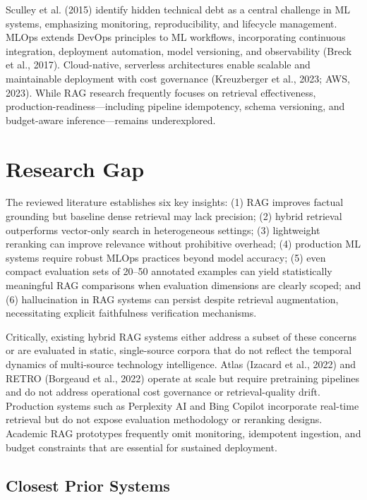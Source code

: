Sculley et al. (2015) identify hidden technical debt as a central challenge in ML systems, emphasizing monitoring, reproducibility, and lifecycle management. MLOps extends DevOps principles to ML workflows, incorporating continuous integration, deployment automation, model versioning, and observability (Breck et al., 2017). Cloud-native, serverless architectures enable scalable and maintainable deployment with cost governance (Kreuzberger et al., 2023; AWS, 2023). While RAG research frequently focuses on retrieval effectiveness, production-readiness---including pipeline idempotency, schema versioning, and budget-aware inference---remains underexplored.

\section{Research Gap}
\label{sec:gap}

The reviewed literature establishes six key insights: (1) RAG improves factual grounding but baseline dense retrieval may lack precision; (2) hybrid retrieval outperforms vector-only search in heterogeneous settings; (3) lightweight reranking can improve relevance without prohibitive overhead; (4) production ML systems require robust MLOps practices beyond model accuracy; (5) even compact evaluation sets of 20--50 annotated examples can yield statistically meaningful RAG comparisons when evaluation dimensions are clearly scoped; and (6) hallucination in RAG systems can persist despite retrieval augmentation, necessitating explicit faithfulness verification mechanisms.

Critically, existing hybrid RAG systems either address a subset of these concerns or are evaluated in static, single-source corpora that do not reflect the temporal dynamics of multi-source technology intelligence. Atlas (Izacard et al., 2022) and RETRO (Borgeaud et al., 2022) operate at scale but require pretraining pipelines and do not address operational cost governance or retrieval-quality drift. Production systems such as Perplexity AI and Bing Copilot incorporate real-time retrieval but do not expose evaluation methodology or reranking designs. Academic RAG prototypes frequently omit monitoring, idempotent ingestion, and budget constraints that are essential for sustained deployment.

\subsection{Closest Prior Systems}
\label{sec:closest_prior}

